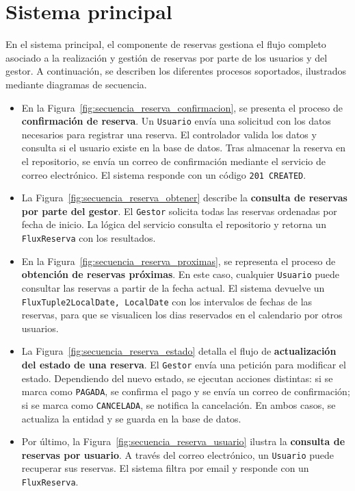 \section{Sistema principal}
En el sistema principal, el componente de reservas gestiona el flujo completo asociado a la realización y gestión de reservas por parte de los usuarios y del gestor. A continuación, se describen los diferentes procesos soportados, ilustrados mediante diagramas de secuencia.

\begin{itemize}

\item En la Figura~\ref{fig:secuencia_reserva_confirmacion}, se presenta el proceso de \textbf{confirmación de reserva}. Un \texttt{Usuario} envía una solicitud con los datos necesarios para registrar una reserva. El controlador valida los datos y consulta si el usuario existe en la base de datos. Tras almacenar la reserva en el repositorio, se envía un correo de confirmación mediante el servicio de correo electrónico. El sistema responde con un código \texttt{201 CREATED}.

\item La Figura~\ref{fig:secuencia_reserva_obtener} describe la \textbf{consulta de reservas por parte del gestor}. El \texttt{Gestor} solicita todas las reservas ordenadas por fecha de inicio. La lógica del servicio consulta el repositorio y retorna un \texttt{Flux\<Reserva\>} con los resultados.

\item En la Figura~\ref{fig:secuencia_reserva_proximas}, se representa el proceso de \textbf{obtención de reservas próximas}. En este caso, cualquier \texttt{Usuario} puede consultar las reservas a partir de la fecha actual. El sistema devuelve un \texttt{Flux\<Tuple2\<LocalDate, LocalDate\>} con los intervalos de fechas de las reservas, para que se visualicen los dias reservados en el calendario por otros usuarios.

\item La Figura~\ref{fig:secuencia_reserva_estado} detalla el flujo de \textbf{actualización del estado de una reserva}. El \texttt{Gestor} envía una petición para modificar el estado. Dependiendo del nuevo estado, se ejecutan acciones distintas: si se marca como \texttt{PAGADA}, se confirma el pago y se envía un correo de confirmación; si se marca como \texttt{CANCELADA}, se notifica la cancelación. En ambos casos, se actualiza la entidad y se guarda en la base de datos.

\item Por último, la Figura~\ref{fig:secuencia_reserva_usuario} ilustra la \textbf{consulta de reservas por usuario}. A través del correo electrónico, un \texttt{Usuario} puede recuperar sus reservas. El sistema filtra por email y responde con un \texttt{Flux\<Reserva\>}.

\end{itemize}


